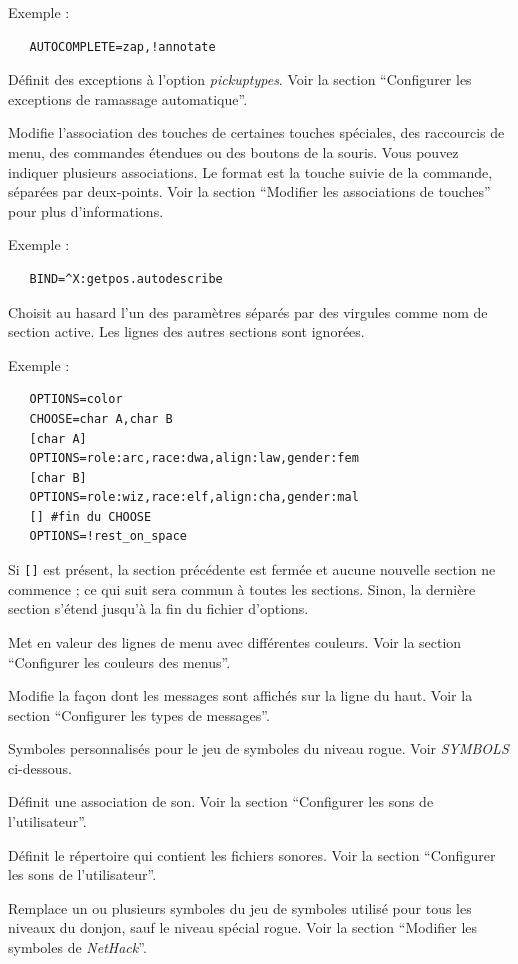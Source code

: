 \documentclass[titlepage]{article}
\begin{document}
\begin{description}
Exemple :
\begin{verbatim}
   AUTOCOMPLETE=zap,!annotate
\end{verbatim}

\item[AUTOPICKUP\textunderscore EXCEPTION]
Définit des exceptions à l'option {\textit{pickup\textunderscore types}}.
Voir la section ``Configurer les exceptions de ramassage automatique''.
\item[BINDINGS]
Modifie l'association des touches de certaines touches spéciales, des raccourcis de menu,
des commandes étendues ou des boutons de la souris. Vous pouvez indiquer plusieurs associations.
Le format est la touche suivie de la commande, séparées par deux-points.
Voir la section ``Modifier les associations de touches'' pour plus d'informations.

Exemple :
\begin{verbatim}
   BIND=^X:getpos.autodescribe
\end{verbatim}

\item[CHOOSE]
Choisit au hasard l'un des paramètres séparés par des virgules comme nom de
section active.
Les lignes des autres sections sont ignorées.

Exemple :
\begin{verbatim}
   OPTIONS=color
   CHOOSE=char A,char B
   [char A]
   OPTIONS=role:arc,race:dwa,align:law,gender:fem
   [char B]
   OPTIONS=role:wiz,race:elf,align:cha,gender:mal
   [] #fin du CHOOSE
   OPTIONS=!rest_on_space
\end{verbatim}

Si \texttt{[]} est présent, la section précédente est fermée et aucune nouvelle
section ne commence ; ce qui suit sera commun à toutes les sections.
Sinon, la dernière section s'étend jusqu'à la fin du fichier d'options.

\item[MENUCOLOR]
Met en valeur des lignes de menu avec différentes couleurs.
Voir la section ``Configurer les couleurs des menus''.
\item[MSGTYPE]
Modifie la façon dont les messages sont affichés sur la ligne du haut.
Voir la section ``Configurer les types de messages''.
\item[ROGUESYMBOLS]
Symboles personnalisés pour le jeu de symboles du niveau rogue.
Voir \textit{SYMBOLS} ci-dessous.
\item[SOUND]
Définit une association de son.
Voir la section ``Configurer les sons de l'utilisateur''.
\item[SOUNDDIR]
Définit le répertoire qui contient les fichiers sonores.
Voir la section ``Configurer les sons de l'utilisateur''.
\item[SYMBOLS]
Remplace un ou plusieurs symboles du jeu de symboles utilisé pour tous les niveaux
du donjon, sauf le niveau spécial rogue.
Voir la section ``Modifier les symboles de \textit{NetHack}''.


\end{description}
\end{document}
